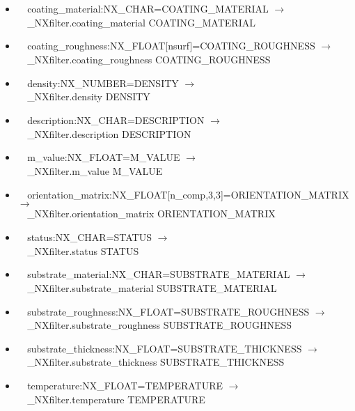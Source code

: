 \documentclass[11pt]{article}
\begin{document}
{{\begin{itemize}
\item{\verb|  |coating\_material:NX\_CHAR=COATING\_MATERIAL $\rightarrow$\\
\verb|  |\_NXfilter.coating\_material COATING\_MATERIAL}

\item{\verb|  |coating\_roughness:NX\_FLOAT[nsurf]=COATING\_ROUGHNESS $\rightarrow$\\
\verb|  |\_NXfilter.coating\_roughness COATING\_ROUGHNESS}

\item{\verb|  |density:NX\_NUMBER=DENSITY $\rightarrow$\\
\verb|  |\_NXfilter.density DENSITY}

\item{\verb|  |description:NX\_CHAR=DESCRIPTION $\rightarrow$\\
\verb|  |\_NXfilter.description DESCRIPTION}

\item{\verb|  |m\_value:NX\_FLOAT=M\_VALUE $\rightarrow$\\
\verb|  |\_NXfilter.m\_value M\_VALUE}

\item{\verb|  |orientation\_matrix:NX\_FLOAT[n\_comp,3,3]=ORIENTATION\_MATRIX $\rightarrow$\\
\verb|  |\_NXfilter.orientation\_matrix ORIENTATION\_MATRIX}

\item{\verb|  |status:NX\_CHAR=STATUS $\rightarrow$\\
\verb|  |\_NXfilter.status STATUS}

\item{\verb|  |substrate\_material:NX\_CHAR=SUBSTRATE\_MATERIAL $\rightarrow$\\
\verb|  |\_NXfilter.substrate\_material SUBSTRATE\_MATERIAL}

\item{\verb|  |substrate\_roughness:NX\_FLOAT=SUBSTRATE\_ROUGHNESS $\rightarrow$\\
\verb|  |\_NXfilter.substrate\_roughness SUBSTRATE\_ROUGHNESS}

\item{\verb|  |substrate\_thickness:NX\_FLOAT=SUBSTRATE\_THICKNESS $\rightarrow$\\
\verb|  |\_NXfilter.substrate\_thickness SUBSTRATE\_THICKNESS}

\item{\verb|  |temperature:NX\_FLOAT=TEMPERATURE $\rightarrow$\\
\verb|  |\_NXfilter.temperature TEMPERATURE}


\end{itemize}}}
\end{document}
